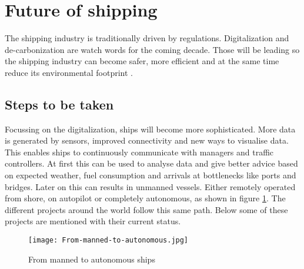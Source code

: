 \section{Future of shipping}
\label{sec:future}
The shipping industry is traditionally driven by regulations. Digitalization and de-carbonization are watch words for the coming decade. Those will be leading so the shipping industry can become safer, more efficient and at the same time reduce its environmental footprint \cite{Eriksen2017}. \\ 

\subsection{Steps to be taken}
Focussing on the digitalization, ships will become more sophisticated. More data is generated by sensors, improved connectivity and new ways to visualise data. This enables ships to continuously communicate with managers and traffic controllers. At first this can be used to analyse data and give better advice based on expected weather, fuel consumption and arrivals at bottlenecks like ports and bridges.
Later on this can results in unmanned vessels. Either remotely operated from shore, on autopilot or completely autonomous, as shown in figure \ref{fig:From-manned-to-autonomous}. The different projects around the world follow this same path. Below some of these projects are mentioned with their current status.

\begin{figure}[hb]
	\centering
	\texttt{[image: From-manned-to-autonomous.jpg]}
	\caption{From manned to autonomous ships}
	\label{fig:From-manned-to-autonomous}
\end{figure}

